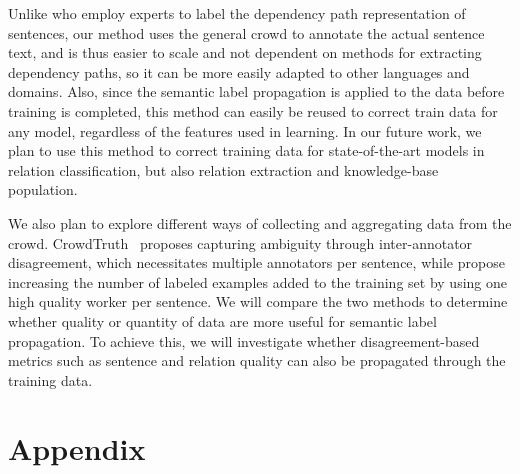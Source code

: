 Unlike \citet{sterckx2016knowledge} who employ experts to label the dependency path representation of sentences, our method uses the general crowd to annotate the actual sentence text, and is thus easier to scale and not dependent on methods for extracting dependency paths, so it can be more easily adapted to other languages and domains.  Also, since the semantic label propagation is applied to the data before training is completed, this method can easily be reused to correct train data for any model, regardless of the features used in learning.  In our future work, we plan to use this method to correct training data for state-of-the-art models in relation classification, but also relation extraction and knowledge-base population.

We also plan to explore different ways of collecting and aggregating data from the crowd. CrowdTruth~\cite{dumitrache2017false} proposes capturing ambiguity through inter-annotator disagreement, which necessitates multiple annotators per sentence, while \citet{liu2016effective} propose increasing the number of labeled examples added to the training set by using one high quality worker per sentence. We will compare the two methods to determine whether quality or quantity of data are more useful for semantic label propagation. To achieve this, we will investigate whether disagreement-based metrics such as sentence and relation quality can also be propagated through the training data.



\section*{Appendix}
\label{sec:appendix4.1}

